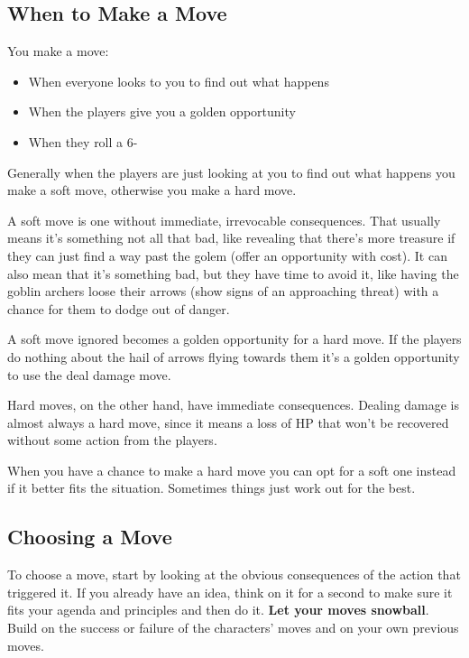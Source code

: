 \subsection{When to Make a Move}


 You make a move:
\begin{itemize}
\item When everyone looks to you to find out what happens
\item When the players give you a golden opportunity
\item When they roll a 6-

\end{itemize}


 Generally when the players are just looking at you to find out what happens you make a soft move, otherwise you make a hard move.


 A soft move is one without immediate, irrevocable consequences. That usually means it's something not all that bad, like revealing that there's more treasure if they can just find a way past the golem (offer an opportunity with cost). It can also mean that it's something bad, but they have time to avoid it, like having the goblin archers loose their arrows (show signs of an approaching threat) with a chance for them to dodge out of danger.


 A soft move ignored becomes a golden opportunity for a hard move. If the players do nothing about the hail of arrows flying towards them it's a golden opportunity to use the deal damage move.


 Hard moves, on the other hand, have immediate consequences. Dealing damage is almost always a hard move, since it means a loss of HP that won't be recovered without some action from the players.


 When you have a chance to make a hard move you can opt for a soft one instead if it better fits the situation. Sometimes things just work out for the best.
\subsection{Choosing a Move}


 To choose a move, start by looking at the obvious consequences of the action that triggered it. If you already have an idea, think on it for a second to make sure it fits your agenda and principles and then do it. \textbf{Let your moves snowball}. Build on the success or failure of the characters' moves and on your own previous moves.


